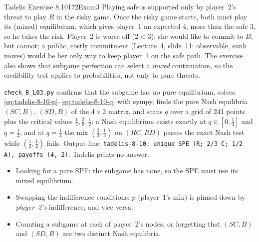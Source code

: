 \begin{exsol}{Tadelis Exercise 8.10}{172}{Exam}{3}
\interp Playing safe is supported only by player~2's threat to play $B$ in the risky game. Once
the risky game starts, both must play its (mixed) equilibrium, which gives player~1 an expected
4, more than the safe 3, so he takes the risk. Player~2 is worse off ($2 < 3$): she would like to
commit to $B$, but cannot; a public, costly commitment (Lecture~4, slide~11: observable, sunk
moves) would be her only way to keep player~1 on the safe path. The exercise also shows that
subgame perfection can select a \emph{mixed} continuation, so the credibility test applies to
probabilities, not only to pure threats.

\verify \texttt{check\_B\_L03.py} confirms that the subgame has no pure equilibrium, solves
\eqref{eq:tadelis-8-10-p}--\eqref{eq:tadelis-8-10-q} with sympy, finds the pure Nash equilibria
$(SC,B)$, $(SD,B)$ of the $4\times2$ matrix, and scans $q$ over a grid of 241 points plus the
critical values $\frac14, \frac38, \frac12$: a Nash equilibrium exists exactly at $q \in
[0, \frac14]$ and $q = \frac12$, and at $q=\frac12$ the mix $(\frac23, \frac13)$ on $(RC, RD)$
passes the exact Nash test while $(\frac12, \frac12)$ fails. Output line: \texttt{tadelis-8-10:
unique SPE (R; 2/3 C; 1/2 A), payoffs (4, 2)}. Tadelis prints no answer.

\mistakes
\begin{itemize}
  \item Looking for a pure SPE: the subgame has none, so the SPE must use its mixed equilibrium.
  \item Swapping the indifference conditions: $p$ (player~1's mix) is pinned down by
  \emph{player~2's} indifference, and vice versa.
  \item Counting a subgame at each of player~2's nodes, or forgetting that $(SC, B)$ and $(SD, B)$
  are two distinct Nash equilibria.
\end{itemize}

\end{exsol}
